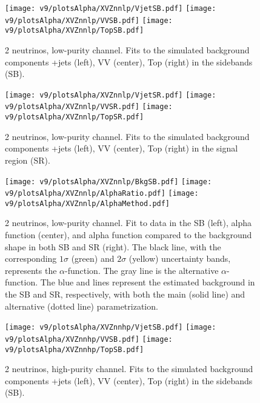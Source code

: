 \clearpage


\begin{figure}[!htb]
  \centering
    \texttt{[image: v9/plotsAlpha/XVZnnlp/VjetSB.pdf]}
    \texttt{[image: v9/plotsAlpha/XVZnnlp/VVSB.pdf]}
    \texttt{[image: v9/plotsAlpha/XVZnnlp/TopSB.pdf]}
    \caption{2 neutrinos, low-purity channel. Fits to the simulated background components \V+jets (left), VV (center), Top (right) in the sidebands (SB).}
  \label{fig:XVZnnlp_SB}
\end{figure}

\begin{figure}[!htb]
  \centering
    \texttt{[image: v9/plotsAlpha/XVZnnlp/VjetSR.pdf]}
    \texttt{[image: v9/plotsAlpha/XVZnnlp/VVSR.pdf]}
    \texttt{[image: v9/plotsAlpha/XVZnnlp/TopSR.pdf]}
    \caption{2 neutrinos, low-purity channel. Fits to the simulated background components \V+jets (left), VV (center), Top (right) in the signal region (SR).}
  \label{fig:XVZnnlp_SR}
\end{figure}

\begin{figure}[!htb]
  \centering
    \texttt{[image: v9/plotsAlpha/XVZnnlp/BkgSB.pdf]}
    \texttt{[image: v9/plotsAlpha/XVZnnlp/AlphaRatio.pdf]}
    \texttt{[image: v9/plotsAlpha/XVZnnlp/AlphaMethod.pdf]}
  \caption{2 neutrinos, low-purity channel. Fit to data in the SB (left), alpha function (center), and alpha function compared to the background shape in both SB and SR (right). The black line, with the corresponding $1\sigma$ (green) and $2\sigma$ (yellow) uncertainty bands, represents the $\alpha$-function. The gray line is the alternative $\alpha$-function. The blue and lines represent the estimated background in the SB and SR, respectively, with both the main (solid line) and alternative (dotted line) parametrization.}
  \label{fig:XVZnnlp_Alpha}
\end{figure}


\begin{figure}[!htb]
  \centering
    \texttt{[image: v9/plotsAlpha/XVZnnhp/VjetSB.pdf]}
    \texttt{[image: v9/plotsAlpha/XVZnnhp/VVSB.pdf]}
    \texttt{[image: v9/plotsAlpha/XVZnnhp/TopSB.pdf]}
    \caption{2 neutrinos, high-purity channel. Fits to the simulated background components \V+jets (left), VV (center), Top (right) in the sidebands (SB).}
  \label{fig:XVZnnhp_SB}
\end{figure}

